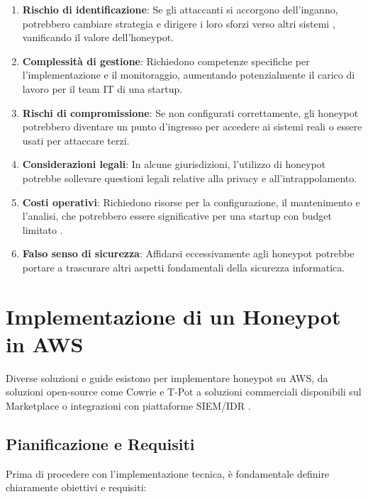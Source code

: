 \documentclass[a4paper,12pt]{report}
\begin{document}
\begin{enumerate}
    \item \textbf{Rischio di identificazione}: Se gli attaccanti si accorgono dell'inganno, potrebbero cambiare strategia e dirigere i loro sforzi verso altri sistemi \cite{insic2023, perego_2023}, vanificando il valore dell'honeypot.
    \item \textbf{Complessità di gestione}: Richiedono competenze specifiche per l'implementazione e il monitoraggio, aumentando potenzialmente il carico di lavoro per il team IT di una startup.
    \item \textbf{Rischi di compromissione}: Se non configurati correttamente, gli honeypot potrebbero diventare un punto d'ingresso per accedere ai sistemi reali \cite{universeit2021} o essere usati per attaccare terzi.
    \item \textbf{Considerazioni legali}: In alcune giurisdizioni, l'utilizzo di honeypot potrebbe sollevare questioni legali relative alla privacy e all'intrappolamento.
    \item \textbf{Costi operativi}: Richiedono risorse per la configurazione, il mantenimento e l'analisi, che potrebbero essere significative per una startup con budget limitato \cite{reddit_ec2}.
    \item \textbf{Falso senso di sicurezza}: Affidarsi eccessivamente agli honeypot potrebbe portare a trascurare altri aspetti fondamentali della sicurezza informatica.
\end{enumerate}

\section{Implementazione di un Honeypot in AWS}
\label{sec:implementazione_aws}

Diverse soluzioni e guide esistono per implementare honeypot su AWS, da soluzioni open-source come Cowrie \cite{cowrie_aws, infosanity_2020, cowrie_devs_2024} e T-Pot \cite{zhang_2023} a soluzioni commerciali disponibili sul Marketplace \cite{aws_marketplace} o integrazioni con piattaforme SIEM/IDR \cite{rapid7, 10183431}.

\subsection{Pianificazione e Requisiti}
\label{subsec:pianificazione}

Prima di procedere con l'implementazione tecnica, è fondamentale definire chiaramente obiettivi e requisiti:
\end{document}
